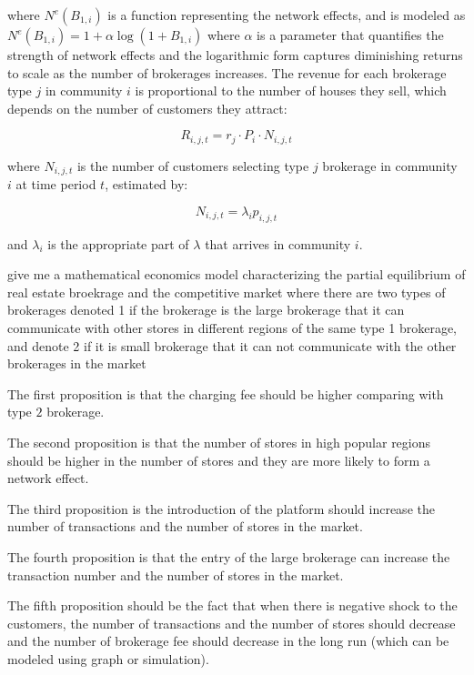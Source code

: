 \documentclass[12pt]{article}
\begin{document}
where $N^e(B_{1, i})$ is a function representing the network effects, and is modeled as $N^e(B_{1, i}) = 1 + \alpha \log(1 + B_{1, i})$ where $\alpha$ is a parameter that quantifies the strength of network effects and the logarithmic form captures diminishing returns to scale as the number of brokerages increases. The revenue for each brokerage type $j$ in community $i$ is proportional to the number of houses they sell, which depends on the number of customers they attract:

\begin{equation}
  R_{i, j, t} = r_j \cdot P_i \cdot N_{i, j, t}
\end{equation}

where $N_{i, j, t}$ is the number of customers selecting type $j$ brokerage in community $i$ at time period $t$, estimated by:

\begin{equation}
  N_{i, j, t} = \lambda_i p_{i, j, t}
\end{equation}

and $\lambda_i$ is the appropriate part of $\lambda$ that arrives in community $i$.


give me a mathematical economics model characterizing the partial equilibrium of real estate broekrage and the competitive market where there are two types of brokerages denoted 1 if the brokerage is the large brokerage that it can communicate with other stores in different regions of the same type 1 brokerage, and denote 2 if it is small brokerage that it can not communicate with the other brokerages in the market

The first proposition is that the charging fee should be higher comparing with type $2$ brokerage.

The second proposition is that the number of stores in high popular regions should be higher in the number of stores and they are more likely to form a network effect.

The third proposition is the introduction of the platform should increase the number of transactions and the number of stores in the market.

The fourth proposition is that the entry of the large brokerage can increase the transaction number and the number of stores in the market.

The fifth proposition should be the fact that when there is negative shock to the customers, the number of transactions and the number of stores should decrease and the number of brokerage fee should decrease in the long run (which can be modeled using graph or simulation).
\end{document}
